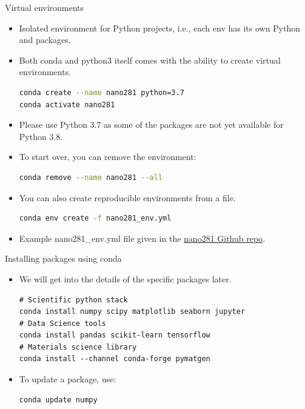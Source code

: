 \documentclass[aspectratio=169]{beamer}
\begin{document}
\begin{frame}[fragile]{Virtual environments}
    \begin{itemize}
        \item Isolated environment for Python projects, i.e., each env has its own Python and packages.
        \item Both conda and python3 itself comes with the ability to create virtual environments.
        \begin{lstlisting}[language=bash]
conda create --name nano281 python=3.7
conda activate nano281
        \end{lstlisting}
        \item Please use Python 3.7 as some of the packages are not yet available for Python 3.8.
        \item To start over, you can remove the environment:
        \begin{lstlisting}[language=bash]
conda remove --name nano281 --all
        \end{lstlisting}
        \item You can also create reproducible environments from a file.
        \begin{lstlisting}[language=bash]
conda env create -f nano281_env.yml
        \end{lstlisting}
        \item Example nano281\_env.yml file given in the \href{https://github.com/materialsvirtuallab/nano281}{nano281 Github repo}.
    \end{itemize}
\end{frame}


\begin{frame}[fragile]{Installing packages using conda}
    \begin{itemize}
        \item We will get into the details of the specific packages later.
    \begin{lstlisting}
# Scientific python stack
conda install numpy scipy matplotlib seaborn jupyter
# Data Science tools
conda install pandas scikit-learn tensorflow
# Materials science library
conda install --channel conda-forge pymatgen
    \end{lstlisting}
        \item To update a package, use:
    \begin{lstlisting}
conda update numpy
    \end{lstlisting}
    \end{itemize}
\end{frame}
\end{document}
